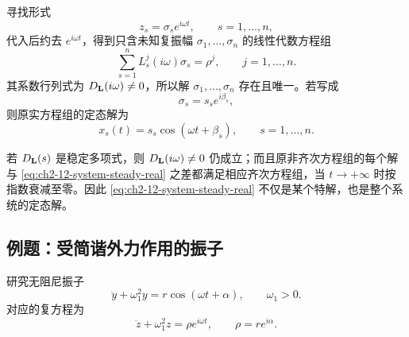 寻找形式
\begin{equation}
 z_s=\sigma_se^{i\omega t},
 \qquad s=1,\ldots,n,
 \label{eq:ch2-12-system-steady-ansatz}
\end{equation}
代入后约去 \(e^{i\omega t}\)，得到只含未知复振幅 \(\sigma_1,\ldots,\sigma_n\) 的线性代数方程组
\begin{equation}
 \sum_{s=1}^nL_s^j(i\omega)\sigma_s=\rho^j,
 \qquad j=1,\ldots,n.
 \label{eq:ch2-12-complex-amplitude-system}
\end{equation}
其系数行列式为 \(D_{\mathbf{L}}(i\omega)\ne0\)，所以解 \(\sigma_1,\ldots,\sigma_n\) 存在且唯一。若写成
\[
 \sigma_s=s_se^{i\beta_s},
\]
则原实方程组的定态解为
\begin{equation}
 x_s(t)=s_s\cos(\omega t+\beta_s),
 \qquad s=1,\ldots,n.
 \label{eq:ch2-12-system-steady-real}
\end{equation}

若 \(D_{\mathbf{L}}(s)\) 是稳定多项式，则 \(D_{\mathbf{L}}(i\omega)\ne0\) 仍成立；而且原非齐次方程组的每个解与 \eqref{eq:ch2-12-system-steady-real} 之差都满足相应齐次方程组，当 \(t\to+\infty\) 时按指数衰减至零。因此 \eqref{eq:ch2-12-system-steady-real} 不仅是某个特解，也是整个系统的定态解。

\subsection*{例题：受简谐外力作用的振子}

研究无阻尼振子
\begin{equation}
 \ddot y+\omega_1^2y=r\cos(\omega t+\alpha),
 \qquad \omega_1>0.
 \label{eq:ch2-12-oscillator-forced}
\end{equation}
对应的复方程为
\begin{equation}
 \ddot z+\omega_1^2z=\rho e^{i\omega t},
 \qquad
 \rho=re^{i\alpha}.
 \label{eq:ch2-12-oscillator-complex-forced}
\end{equation}

